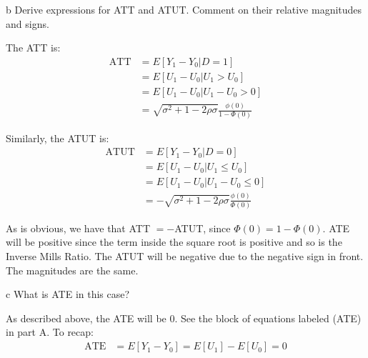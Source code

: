 \documentclass{article}
\begin{document}
\begin{problem}{b}
Derive expressions for ATT and ATUT. Comment on their relative magnitudes and signs.
\end{problem}
\begin{solution}
The ATT is:
\begin{align*}
    \text{ATT} &= E[Y_1-Y_0 | D=1] \\
    &= E[U_1 - U_0 | U_1>U_0] \\
    &= E[U_1 - U_0 | U_1 - U_0 > 0] \\
    &= \sqrt{\sigma^2 + 1 - 2\rho\sigma} \frac{\phi(0)}{1-\Phi(0)}
\end{align*}

Similarly, the ATUT is:
\begin{align*}
    \text{ATUT} &= E[Y_1-Y_0 | D=0] \\
    &= E[U_1 - U_0 | U_1\leq U_0] \\
    &= E[U_1 - U_0 | U_1 - U_0 \leq 0] \\
    &= - \sqrt{\sigma^2 + 1 - 2\rho\sigma} \frac{\phi(0)}{\Phi(0)}
\end{align*}

As is obvious, we have that ATT $= -$ATUT, since $\Phi(0)=1-\Phi(0)$. ATE will be positive since the term inside the square root is positive and so is the Inverse Mills Ratio. The ATUT will be negative due to the negative sign in front. The magnitudes are the same.
\end{solution}

\begin{problem}{c}
What is ATE in this case?
\end{problem}
\begin{solution}
As described above, the ATE will be 0. See the block of equations labeled (ATE) in part A. To recap:
\begin{align*}
    \text{ATE} &= E[Y_1 - Y_0] = E[U_1] - E[U_0] = 0
\end{align*}
\end{solution}
\end{document}
